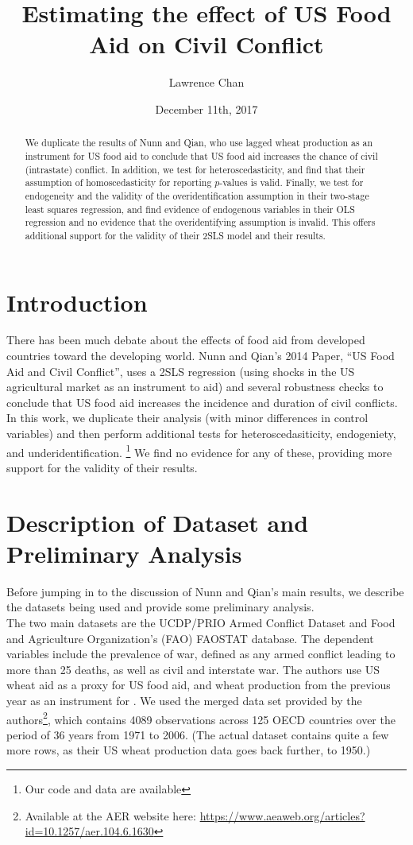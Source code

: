 \documentclass{article}
\title{Estimating the effect of US Food Aid on Civil Conflict}
\author{Lawrence Chan}
\date{December 11th, 2017}
\begin{document}
\maketitle
\begin{abstract}
We duplicate the results of Nunn and Qian, who use lagged wheat production as an instrument for US food aid to conclude that US food aid increases the chance of civil (intrastate) conflict. In addition, we test for heteroscedasticity, and find that their assumption of homoscedasticity for reporting $p$-values is valid. Finally, we test for endogeneity and the validity of the overidentification assumption in their two-stage least squares regression, and find evidence of endogenous variables in their OLS regression and no evidence that the overidentifying assumption is invalid. This offers additional support for the validity of their 2SLS model and their results. 
\end{abstract}
\section{Introduction}
There has been much debate about the effects of food aid from developed countries toward the developing world. Nunn and Qian’s 2014 Paper, “US Food Aid and Civil Conflict”, uses a 2SLS regression (using shocks in the US agricultural market as an instrument to aid) and several robustness checks to conclude that US food aid increases the incidence and duration of civil conflicts.\\

In this work, we duplicate their analysis (with minor differences in control variables) and then perform additional tests for heteroscedasiticity, endogeniety, and underidentification. \footnote{Our code and data are available } We find no evidence for any of these, providing more support for the validity of their results. 

\section{Description of Dataset and Preliminary Analysis}
Before jumping in to the discussion of Nunn and Qian's main results, we describe the datasets being used and provide some preliminary analysis.\\

The two main datasets are the UCDP/PRIO Armed Conflict Dataset and Food and Agriculture Organization’s (FAO) FAOSTAT database. The dependent variables include the prevalence of war, defined as any armed conflict leading to more than 25 deaths, as well as civil and interstate war. The authors use US wheat aid as a proxy for US food aid, and wheat production from the previous year as an instrument for . We used the merged data set provided by the authors\footnote{Available at the AER website here: \href{https://www.aeaweb.org/articles?id=10.1257/aer.104.6.1630}{https://www.aeaweb.org/articles?id=10.1257/aer.104.6.1630}}, which contains 4089 observations across 125 OECD countries over the period of 36 years from 1971 to 2006. (The actual dataset contains quite a few more rows, as their US wheat production data goes back further, to 1950.) \\
\end{document}
